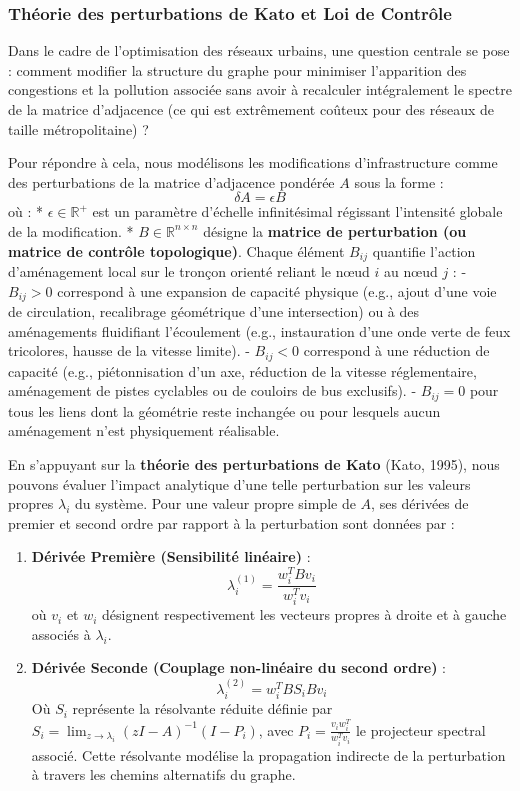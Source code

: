 \documentclass[10pt, a4paper]{article}
\providecommand{\tightlist}{}
\begin{document}
\subsubsection{Théorie des perturbations de Kato et Loi de
Contrôle}\label{thuxe9orie-des-perturbations-de-kato-et-loi-de-contruxf4le}

Dans le cadre de l'optimisation des réseaux urbains, une question
centrale se pose : comment modifier la structure du graphe pour
minimiser l'apparition des congestions et la pollution associée sans
avoir à recalculer intégralement le spectre de la matrice d'adjacence
(ce qui est extrêmement coûteux pour des réseaux de taille
métropolitaine) ?

Pour répondre à cela, nous modélisons les modifications d'infrastructure
comme des perturbations de la matrice d'adjacence pondérée \(A\) sous la
forme : \[\delta A = \epsilon B\] où : * \(\epsilon \in \mathbb{R}^+\)
est un paramètre d'échelle infinitésimal régissant l'intensité globale
de la modification. * \(B \in \mathbb{R}^{n \times n}\) désigne la
\textbf{matrice de perturbation (ou matrice de contrôle topologique)}.
Chaque élément \(B_{ij}\) quantifie l'action d'aménagement local sur le
tronçon orienté reliant le nœud \(i\) au nœud \(j\) : - \(B_{ij} > 0\)
correspond à une expansion de capacité physique (e.g., ajout d'une voie
de circulation, recalibrage géométrique d'une intersection) ou à des
aménagements fluidifiant l'écoulement (e.g., instauration d'une onde
verte de feux tricolores, hausse de la vitesse limite). - \(B_{ij} < 0\)
correspond à une réduction de capacité (e.g., piétonnisation d'un axe,
réduction de la vitesse réglementaire, aménagement de pistes cyclables
ou de couloirs de bus exclusifs). - \(B_{ij} = 0\) pour tous les liens
dont la géométrie reste inchangée ou pour lesquels aucun aménagement
n'est physiquement réalisable.

En s'appuyant sur la \textbf{théorie des perturbations de Kato} (Kato,
1995), nous pouvons évaluer l'impact analytique d'une telle perturbation
sur les valeurs propres \(\lambda_i\) du système. Pour une valeur propre
simple de \(A\), ses dérivées de premier et second ordre par rapport à
la perturbation sont données par :

\begin{enumerate}
\def\labelenumi{\arabic{enumi}.}
\tightlist
\item
  \textbf{Dérivée Première (Sensibilité linéaire)} :
  \[\lambda_i^{(1)} = \frac{w_i^T B v_i}{w_i^T v_i}\] où \(v_i\) et
  \(w_i\) désignent respectivement les vecteurs propres à droite et à
  gauche associés à \(\lambda_i\).
\item
  \textbf{Dérivée Seconde (Couplage non-linéaire du second ordre)} :
  \[\lambda_i^{(2)} = w_i^T B S_i B v_i\] Où \(S_i\) représente la
  résolvante réduite définie par
  \(S_i = \lim_{z \to \lambda_i} (zI - A)^{-1}(I - P_i)\), avec
  \(P_i = \frac{v_i w_i^T}{w_i^T v_i}\) le projecteur spectral associé.
  Cette résolvante modélise la propagation indirecte de la perturbation
  à travers les chemins alternatifs du graphe.
\end{enumerate}
\end{document}
